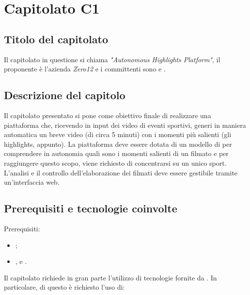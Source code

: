 \section{Capitolato C1}
\subsection{Titolo del capitolato}
Il capitolato in questione si chiama \textit{"Autonomous Highlights Platform"}, il proponente \`e l'azienda \textit{Zero12} e i committenti sono \VT{} e \CR{}.

\subsection{Descrizione del capitolo}
Il capitolato presentato si pone come obiettivo finale di realizzare una piattaforma che, ricevendo in input dei video di eventi sportivi, generi in maniera automatica un breve video (di circa 5 minuti) con i momenti più salienti (gli highlights, appunto).
La piattaforma deve essere dotata di un modello di  per comprendere in autonomia quali sono i momenti salienti di un filmato e per raggiungere questo scopo, viene richiesto di concentrarsi su un unico sport.
L'analisi e il controllo dell'elaborazione dei filmati deve essere gestibile tramite un'interfaccia web.

\subsection{Prerequisiti e tecnologie coinvolte}
Prerequisiti:
\begin{itemize}
\item {};
\item {},  e .
\end{itemize}
Il capitolato richiede in gran parte l'utilizzo di tecnologie fornite da .
In particolare, di questo \`e richiesto l'uso di:

